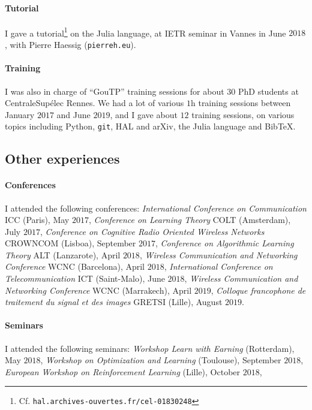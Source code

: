 \paragraph{Tutorial}
    I gave a tutorial\footnote{Cf. \texttt{hal.archives-ouvertes.fr/cel-01830248}} on the Julia language, at IETR seminar in Vannes in June $2018$,
    with Pierre Haessig (\texttt{pierreh.eu}).

\paragraph{Training}
    I was also in charge of ``GouTP'' training sessions for about $30$ PhD students at CentraleSupélec Rennes.
    We had a lot of various $1$h training sessions between January $2017$ and June $2019$,
    and I gave about $12$ training sessions, on various topics including Python, \texttt{git}, HAL and arXiv, the Julia language and Bib\TeX{}.


\subsection{Other experiences}

\paragraph{Conferences}
    I attended the following conferences:
	\emph{International Conference on Communication} ICC (Paris), May $2017$,
    \emph{Conference on Learning Theory} COLT (Amsterdam), July $2017$,
    \emph{Conference on Cognitive Radio Oriented Wireless Networks} CROWNCOM (Lisboa), September $2017$,
    \emph{Conference on Algorithmic Learning Theory} ALT (Lanzarote), April $2018$,
    \emph{Wireless Communication and Networking Conference} WCNC (Barcelona), April $2018$,
	\emph{International Conference on Telecommunication} ICT (Saint-Malo), June $2018$,
    \emph{Wireless Communication and Networking Conference} WCNC (Marrakech), April $2019$,
    \emph{Colloque francophone de traitement du signal et des images} GRETSI (Lille), August $2019$.

\paragraph{Seminars}
    I attended the following seminars:
	\emph{Workshop Learn with Earning} (Rotterdam), May $2018$,
	\emph{Workshop on Optimization and Learning} (Toulouse), September $2018$,
	\emph{European Workshop on Reinforcement Learning} (Lille), October $2018$,

